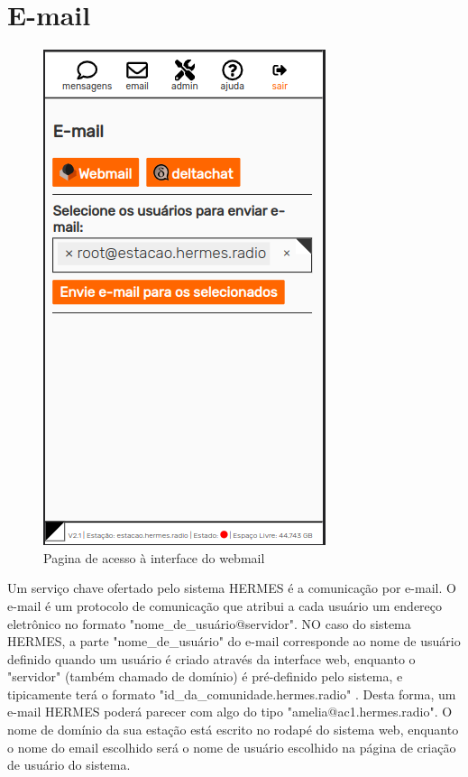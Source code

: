 \documentclass[11pt,a4paper]{article}
\begin{document}
\section{E-mail}
\label{email}

\begin{figure}[H]
    \centering
    \includegraphics[width=0.5\columnwidth]{screenshots/frontend/pt_kn/email.png}
    	\caption{Pagina de acesso à interface do webmail}
	\vspace{-10pt}
    \label{fig:webmail2}
\end{figure}

Um serviço chave ofertado pelo sistema HERMES é a comunicação por e-mail. O e-mail é um protocolo de comunicação que atribui a cada usuário um endereço eletrônico no formato "nome\_de\_usuário@servidor". NO caso do sistema HERMES, a parte "nome\_de\_usuário" do e-mail corresponde ao nome de usuário definido quando um usuário é criado através da interface web, enquanto o "servidor" (também chamado de domínio) é pré-definido pelo sistema, e tipicamente terá o formato "id\_da\_comunidade.hermes.radio" . Desta forma, um e-mail HERMES poderá parecer com algo do tipo "amelia@ac1.hermes.radio". O nome de domínio da sua estação está escrito no rodapé do sistema web,
enquanto o nome do email escolhido será o nome de usuário escolhido na página de criação de usuário do sistema. 

\end{document}
